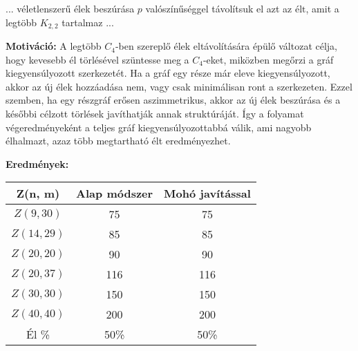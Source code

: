 \documentclass[12pt,a4paper]{article}
\begin{document}
\begin{algorithm}
\begin{algorithmic}[1]
    \State ...
        \State véletlenszerű élek beszúrása $p$ valószínűséggel
            \State távolítsuk el azt az $\text{élt}$, amit a legtöbb $K_{2,2}$ tartalmaz
        \EndWhile
    \EndFor
    \State ...
\end{algorithmic}
\end{algorithm}

\textbf{Motiváció:} A legtöbb $C_4$-ben szereplő élek eltávolítására épülő változat célja, hogy kevesebb él törlésével szüntesse meg a $C_4$-eket, miközben megőrzi a gráf kiegyensúlyozott szerkezetét. Ha a gráf egy része már eleve kiegyensúlyozott, akkor az új élek hozzáadása nem, vagy csak minimálisan ront a szerkezeten. Ezzel szemben, ha egy részgráf erősen aszimmetrikus, akkor az új élek beszúrása és a későbbi célzott törlések javíthatják annak struktúráját. Így a folyamat végeredményeként a teljes gráf kiegyensúlyozottabbá válik, ami nagyobb élhalmazt, azaz több megtartható élt eredményezhet.

\textbf{Eredmények:}
\begin{table}[H]
\centering
\begin{tabular}{|c|c|c|}
\hline
\textbf{Z(n, m)} & \textbf{Alap módszer} & \textbf{Mohó javítással} \\
\hline
$Z(9,30)$  & 75 & 75 \\
$Z(14, 29)$ & 85 & 85 \\
$Z(20, 20)$ & 90 & 90 \\
$Z(20, 37)$ & 116 & 116 \\
$Z(30, 30)$ & 150 & 150 \\
$Z(40, 40)$ & 200 & 200 \\
\hline
Él \% & 50\% & 50\% \\
\hline
\end{tabular}
\end{table}
\end{document}
